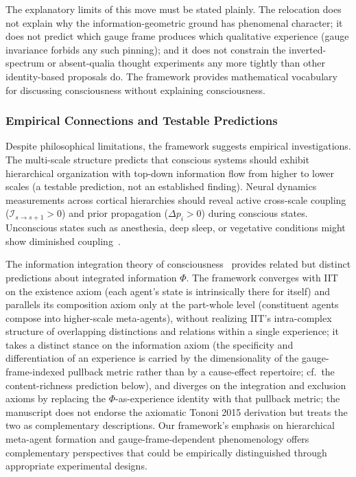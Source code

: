 \documentclass[11pt]{article}
\begin{document}
The explanatory limits of this move must be stated plainly. The relocation does not explain why the information-geometric ground has phenomenal character; it does not predict which gauge frame produces which qualitative experience (gauge invariance forbids any such pinning); and it does not constrain the inverted-spectrum or absent-qualia thought experiments any more tightly than other identity-based proposals do. The framework provides mathematical vocabulary for discussing consciousness without explaining consciousness.

\subsubsection{Empirical Connections and Testable Predictions}

Despite philosophical limitations, the framework suggests empirical investigations. The multi-scale structure predicts that conscious systems should exhibit hierarchical organization with top-down information flow from higher to lower scales (a testable prediction, not an established finding). Neural dynamics measurements across cortical hierarchies should reveal active cross-scale coupling ($\mathcal{I}_{s \to s+1} > 0$) and prior propagation ($\Delta p_i > 0$) during conscious states. Unconscious states such as anesthesia, deep sleep, or vegetative conditions might show diminished coupling~\cite{Mashour2020, Luppi2021}.

The information integration theory of consciousness~\cite{Tononi2004, Tononi2016} provides related but distinct predictions about integrated information $\Phi$. The framework converges with IIT on the existence axiom (each agent's state is intrinsically there for itself) and parallels its composition axiom only at the part-whole level (constituent agents compose into higher-scale meta-agents), without realizing IIT's intra-complex structure of overlapping distinctions and relations within a single experience; it takes a distinct stance on the information axiom (the specificity and differentiation of an experience is carried by the dimensionality of the gauge-frame-indexed pullback metric rather than by a cause-effect repertoire; cf.\ the content-richness prediction below), and diverges on the integration and exclusion axioms by replacing the $\Phi$-as-experience identity with that pullback metric; the manuscript does not endorse the axiomatic Tononi 2015 derivation but treats the two as complementary descriptions. Our framework's emphasis on hierarchical meta-agent formation and gauge-frame-dependent phenomenology offers complementary perspectives that could be empirically distinguished through appropriate experimental designs.
\end{document}
